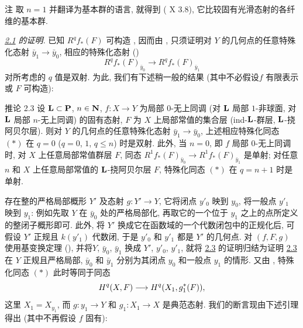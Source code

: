 \begin{enonce*}[remark]{注}
取 $n=1$ 并翻译为基本群的语言, 就得到 ( X 3.8), 它比较固有光滑态射的各纤维的基本群.
\end{enonce*}

\noindent
\emph{\hyperref[XVI.thm2.1]{2.1} 的证明}. 已知 $R^{q}f_{\ast}(F)$ 可构造 , 因而由 , 只须证明对 $Y$ 的几何点的任意特殊化态射 $\bar{y}_1\rightarrow \bar{y}_{0}$, 相应的特殊化态射 ()
\begin{equation*}
R^{q}f_{\ast}(F)_{\bar{y}_{0}}\longrightarrow
R^{q}f_{\ast}(F)_{\bar{y}_1}\tag{$\ast$}
\end{equation*}
对所考虑的 $q$ 值是双射. 为此, 我们有下述稍一般的结果 (其中不必假设\pageoriginale $f$ 有限表示或 $F$ 可构造):

\begin{enonce*}{推论 2.3}
设 $\mathbf{L}\subset \mathbf{P}$, $n\in \mathbf{N}$, $f:X\rightarrow Y$ 为局部 $0$-无上同调 (\resp 对 $\mathbf{L}$ 局部 $1$-非球面, \resp 对 $\mathbf{L}$ 局部 $n$-无上同调) 的固有态射, $F$ 为 $X$ 上局部常值的集合层 (\resp ind-$\mathbf{L}$-群层, \resp $\mathbf{L}$-挠阿贝尔层). 则对 $Y$ 的几何点的任意特殊化态射 $\bar{y}_1\rightarrow \bar{y}_0$, 上述相应特殊化同态 $(\ast)$ 在 $q=0$ (\resp $q=0$, $1$, \resp $q\leq n$) 时是双射. 此外, 当 $n=0$, 即 $f$ 局部 $0$-无上同调时, 对 $X$ 上任意局部常值群层 $F$, 同态 $R^{1}f_{\ast}(F)_{\bar{y}_0}\rightarrow R^{1}f_{\ast}(F)_{\bar{y}_1}$ 是单射; 对任意 $n$ 和 $X$ 上任意局部常值的 $\mathbf{L}$-挠阿贝尔层 $F$, 特殊化同态 $(\ast)$ 在 $q=n+1$ 时是单射.
\end{enonce*}

存在整的严格局部概形 $Y'$ 及态射 $g:Y'\rightarrow Y$, 它将闭点 $y'_0$ 映到 $y_{0}$, 将一般点 $y'_1$ 映到 $y_1$: 例如先取 $Y$ 在 $\bar{y}_0$ 处的严格局部化, 再取它的一个位于 $y_1$ 之上的点所定义的整闭子概形即可. 此外, 将 $Y'$ 换成它在函数域的一个代数闭包中的正规化后, 可假设 $Y'$ 正规且 $k(y'_1)$ 代数闭, 于是 $y'_0$ 和 $y'_1$ 都是 $Y'$ 的几何点. 对 $(f,F,g)$ 使用基变换定理 (), 并将\pageoriginale $Y$, $\bar{y}_0$, $\bar{y}_1$ 换成 $Y'$, $y'_0$, $y'_1$, 就将 \hyperref[XVI.cor2.3]{2.3} 的证明归结为证明 \hyperref[XVI.cor2.3]{2.3} 在 $Y$ 正规且严格局部, $\bar{y}_0$ 和 $\bar{y}_1$ 分别为其闭点 $y_0$ 和一般点 $y_1$ 的情形. 又由 , 特殊化同态 $(\ast)$ 此时等同于同态
$$
H^{q}(X,F)\longrightarrow H^{q}(X_1,g^{\ast}_1(F)){},
$$
这里 $X_1=X_{y_1}$, 而 $g:y_1\rightarrow Y$ 和 $g_1:X_1\rightarrow X$ 是典范态射. 我们的断言现由下述引理得出 (其中不再假设 $f$ 固有):


